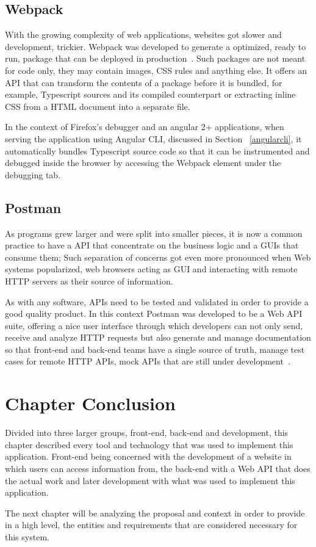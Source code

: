 \subsection{Webpack}
With the growing complexity of web applications, websites got slower and development, trickier. Webpack was developed to generate a optimized, ready to run, package that can be deployed in production~\cite{webpack}. Such packages are not meant for code only, they may contain images, \gls{CSS} rules and anything else. It offers an \gls{API} that can transform the contents of a package before it is bundled, for example, Typescript sources and its compiled counterpart or extracting inline \gls{CSS} from a \gls{HTML} document into a separate file.

In the context of Firefox's debugger and an angular 2+ applications, when serving the application using Angular \gls{CLI}, discussed in Section ~\ref{angularcli}, it automatically bundles Typescript source code so that it can be instrumented and debugged inside the browser by accessing the Webpack element under the debugging tab.

\subsection{Postman}
As programs grew larger and were split into smaller pieces, it is now a common practice to have a \gls{API} that concentrate on the business logic and a \gls{GUI}s that consume them; Such separation of concerns got even more pronounced when Web systems popularized, web browsers acting as \gls{GUI} and interacting with remote \gls{HTTP} servers as their source of information.

As with any software, \gls{API}s need to be tested and validated in order to provide a good quality product. In this context Postman was developed to be a Web \gls{API} suite, offering a nice user interface through which developers can not only send, receive and analyze \gls{HTTP} requests but also generate and manage documentation so that front-end and back-end teams have a single source of truth, manage test cases for remote \gls{HTTP} \gls{API}s, mock \gls{API}s that are still under development~\cite{postman}.

\section{Chapter Conclusion}

Divided into three larger groups, front-end, back-end and development, this chapter described every tool and technology that was used to implement this application. Front-end being concerned with the development of a website in which users can access information from, the back-end with a Web \gls{API} that does the actual work and later development with what was used to implement this application.

The next chapter will be analyzing the proposal and context in order to provide in a high level, the entities and requirements that are considered necessary for this system.